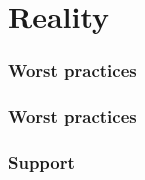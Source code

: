 \section{Reality}
\begin{frame}
\frametitle{Worst practices}
\end{frame}

\begin{frame}
\frametitle{Worst practices}
\end{frame}

\begin{frame}
\frametitle{Support}
\end{frame}